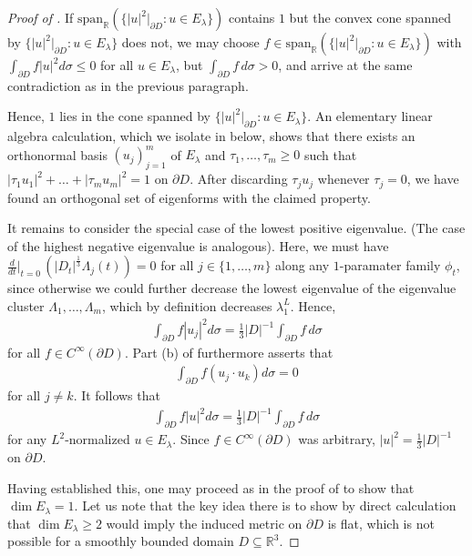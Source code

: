 \documentclass[11pt,reqno]{amsart}
\begin{document}
\begin{proof}[Proof of ]
    If $\mathrm{span}_{\mathbb R}(\{|u|^2|_{\partial D}: u \in E_\lambda\})$ contains $1$ but the convex cone spanned by $\{|u|^2|_{\partial D}: u \in E_\lambda\}$ does not, we may choose $f \in \mathrm{span}_{\mathbb R}(\{|u|^2|_{\partial D}: u \in E_\lambda\})$ with $\int_{\partial D} f |u|^2 d\sigma \leq 0$ for all $u \in E_\lambda$, but $\int_{\partial D} f \, d\sigma > 0$, and arrive at the same contradiction as in the previous paragraph.

    Hence, $1$ lies in the cone spanned by $\{|u|^2|_{\partial D}: u \in E_\lambda\}$. An elementary linear algebra calculation, which we isolate in  below, shows that there exists an orthonormal basis $(u_j)_{j=1}^m$ of $E_\lambda$ and $\tau_1,\ldots,\tau_m \geq 0$ such that $|\tau_1 u_1|^2 + \ldots + |\tau_m u_m|^2 = 1$ on $\partial D$. After discarding $\tau_j u_j$ whenever $\tau_j = 0$, we have found an orthogonal set of eigenforms with the claimed property.

    It remains to consider the special case of the lowest positive eigenvalue. (The case of the highest negative eigenvalue is analogous). Here, we must have $\frac{d}{dt}\big\rvert_{t=0} \, \left( |D_t|^{\frac{1}{3}} \Lambda_j(t) \right) = 0$ for all $j \in \{1,\ldots,m\}$ along any $1$-paramater family $\phi_t$, since otherwise we could further decrease the lowest eigenvalue of the eigenvalue cluster $\Lambda_1,\ldots,\Lambda_m$, which by definition decreases $\lambda_1^L$. Hence,
    \begin{align*}
        \int_{\partial D} f|u_j|^2 d\sigma = \frac13 |D|^{-1} \int_{\partial D} f \, d\sigma 
    \end{align*}
    for all $f \in C^\infty(\partial D)$. Part (b) of  furthermore asserts that
    \begin{align*}
        \int_{\partial D} f(u_j \cdot u_k) d\sigma = 0
    \end{align*}
    for all $j \neq k$. It follows that
    \begin{align*}
        \int_{\partial D} f|u|^2 d\sigma = \frac13 |D|^{-1} \int_{\partial D} f \, d\sigma 
    \end{align*}
    for any $L^2$-normalized $u \in E_\lambda$. Since $f \in C^\infty(\partial D)$ was arbitrary, $|u|^2 = \frac{1}{3} |D|^{-1}$ on $\partial D$.

    Having established this, one may proceed as in the proof of \cite[Proposition 3.6]{Gerner2023} to show that $\dim E_\lambda = 1$. Let us note that the key idea there is to show by direct calculation that $\dim E_\lambda \geq 2$ would imply the induced metric on $\partial D$ is flat, which is not possible for a smoothly bounded domain $D \subseteq \mathbb R^3$.
\end{proof}
\end{document}

